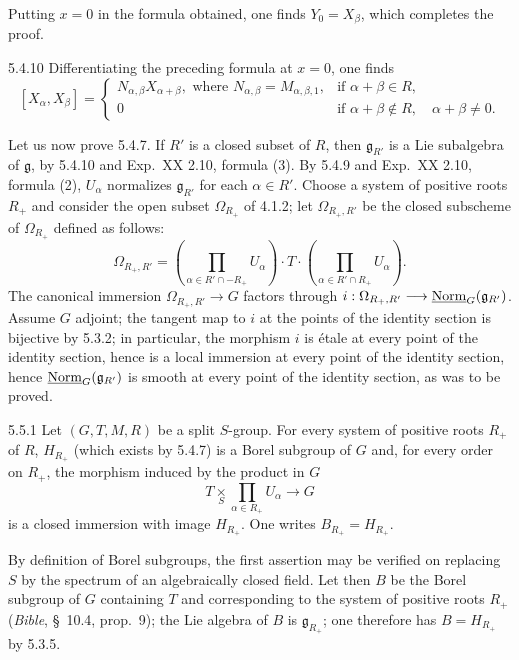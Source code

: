 Putting $x=0$ in the formula obtained, one finds $Y_0=X_\beta$, which completes the proof.
\begin{remark}{5.4.10}\label{XXII.5.4.10}
Differentiating the preceding formula at $x=0$, one finds
\[
[X_\alpha,X_\beta]=\begin{cases}
N_{\alpha,\beta}X_{\alpha+\beta},\text{ where }N_{\alpha,\beta}=M_{\alpha,\beta,1},&\text{if }\alpha+\beta\in R,\\
0&\text{if }\alpha+\beta\notin R,\quad\alpha+\beta\ne0.
\end{cases}
\]
\end{remark}
Let us now prove 5.4.7. If $R'$ is a closed subset of $R$, then $\mathfrak g_{R'}$ is a Lie subalgebra of $\mathfrak g$, by 5.4.10 and Exp.~XX 2.10, formula (3). By 5.4.9 and Exp.~XX 2.10, formula (2), $U_\alpha$ normalizes $\mathfrak g_{R'}$ for each $\alpha\in R'$. Choose a system of positive roots $R_+$ and consider the open subset $\Omega_{R_+}$ of 4.1.2; let $\Omega_{R_+,R'}$ be the closed subscheme of $\Omega_{R_+}$ defined as follows:
\[
\Omega_{R_+,R'}=\left(\prod_{\alpha\in R'\cap-R_+}U_\alpha\right)\cdot T\cdot\left(\prod_{\alpha\in R'\cap R_+}U_\alpha\right).
\]
The canonical immersion $\Omega_{R_+,R'}\to G$ factors through $i:\Omega_{R_+,R'}\longrightarrow\underline{\mathrm{Norm}}_G(\mathfrak g_{R'})$. Assume $G$ adjoint; the tangent map to $i$ at the points of the identity section is bijective by 5.3.2; in particular, the morphism $i$ is \'etale at every point of the identity section, hence is a local immersion{\renewcommand{\thefootnote}{(36)}} at every point of the identity section, hence $\underline{\mathrm{Norm}}_G(\mathfrak g_{R'})$ is smooth at every point of the identity section, as was to be proved.

\begin{proposition}{5.5.1}\label{XXII.5.5.1}
Let $(G,T,M,R)$ be a split $S$-group. For every system of positive roots $R_+$ of $R$, $H_{R_+}$ (which exists by 5.4.7) is a Borel subgroup of $G$ and, for every order on $R_+$, the morphism induced by the product in $G$
\[
T\underset S\times\prod_{\alpha\in R_+}U_\alpha\to G
\]
is a closed immersion with image $H_{R_+}$. One writes $B_{R_+}=H_{R_+}$.
\end{proposition}
By definition of Borel subgroups, the first assertion may be verified on replacing $S$ by the spectrum of an algebraically closed field. Let then $B$ be the Borel subgroup of $G$ containing $T$ and corresponding to the system of positive roots $R_+$ (\textit{Bible}, \S~10.4, prop.~9); the Lie algebra of $B$ is $\mathfrak g_{R_+}$; one therefore has $B=H_{R_+}$ by 5.3.5.

